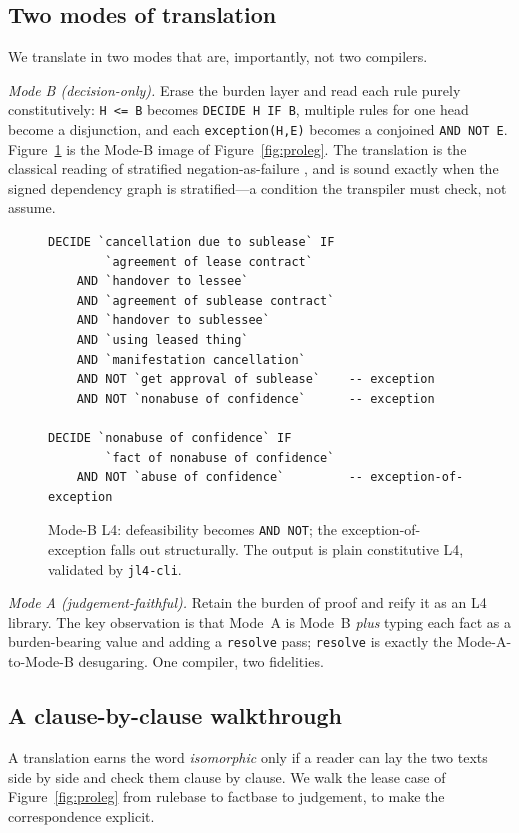 \documentclass[sigconf,nonacm]{acmart}
\newcommand{\code}[1]{\texttt{\small #1}}
\begin{document}
\subsection{Two modes of translation}
We translate in two modes that are, importantly, not two compilers.

\emph{Mode B (decision-only).} Erase the burden layer and read each rule
purely constitutively: \code{H <= B} becomes \code{DECIDE H IF B}, multiple
rules for one head become a disjunction, and each \code{exception(H,E)}
becomes a conjoined \code{AND NOT E}. Figure~\ref{fig:modeb} is the Mode-B
image of Figure~\ref{fig:proleg}. The translation is the classical reading of
stratified negation-as-failure \cite{clark1978naf,gelfond1988stable}, and is
sound exactly when the signed dependency graph is stratified---a condition
the transpiler must check, not assume.

\begin{figure}[t]
\begin{lstlisting}
DECIDE `cancellation due to sublease` IF
        `agreement of lease contract`
    AND `handover to lessee`
    AND `agreement of sublease contract`
    AND `handover to sublessee`
    AND `using leased thing`
    AND `manifestation cancellation`
    AND NOT `get approval of sublease`    -- exception
    AND NOT `nonabuse of confidence`      -- exception

DECIDE `nonabuse of confidence` IF
        `fact of nonabuse of confidence`
    AND NOT `abuse of confidence`         -- exception-of-exception
\end{lstlisting}
\caption{Mode-B L4: defeasibility becomes \code{AND NOT}; the
exception-of-exception falls out structurally. The output is plain
constitutive L4, validated by \code{jl4-cli}.}
\label{fig:modeb}
\end{figure}

\emph{Mode A (judgement-faithful).} Retain the burden of proof and reify it
as an L4 library. The key observation is that Mode~A is Mode~B \emph{plus}
typing each fact as a burden-bearing value and adding a \code{resolve} pass;
\code{resolve} is exactly the Mode-A-to-Mode-B desugaring. One compiler, two
fidelities.

\subsection{A clause-by-clause walkthrough}\label{app:walkthrough}
A translation earns the word \emph{isomorphic} only if a reader can lay the
two texts side by side and check them clause by clause. We walk the lease
case of Figure~\ref{fig:proleg} from rulebase to factbase to judgement, to
make the correspondence explicit.
\end{document}
